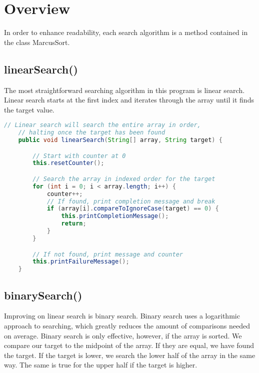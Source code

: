 \documentclass[letterpaper, 10pt]{article}
\begin{document}
\vspace{1.0em}

\section{Overview}

\hspace{1.0em}In order to enhance readability, each search algorithm is a method contained in the class MarcusSort.

\subsection{linearSearch()}

\hspace{1.0em}The most straightforward searching algorithm in this program is linear search. Linear search starts at the first index and iterates through the array until it finds the target value.

\begin{lstlisting}[language=Java, firstnumber=15]
    // Linear search will search the entire array in order,
    // halting once the target has been found
    public void linearSearch(String[] array, String target) {

        // Start with counter at 0
        this.resetCounter();

        // Search the array in indexed order for the target
        for (int i = 0; i < array.length; i++) {
            counter++;
            // If found, print completion message and break
            if (array[i].compareToIgnoreCase(target) == 0) {
                this.printCompletionMessage();
                return;
            }
        }

        // If not found, print message and counter
        this.printFailureMessage();
    }
\end{lstlisting}

\subsection{binarySearch()}

\hspace{1.0em}Improving on linear search is binary search. Binary search uses a logarithmic approach to searching, which greatly reduces the amount of comparisons needed on average. Binary search is only effective, however, if the array is sorted. We compare our target to the midpoint of the array. If they are equal, we have found the target. If the target is lower, we search the lower half of the array in the same way. The same is true for the upper half if the target is higher.
\end{document}
